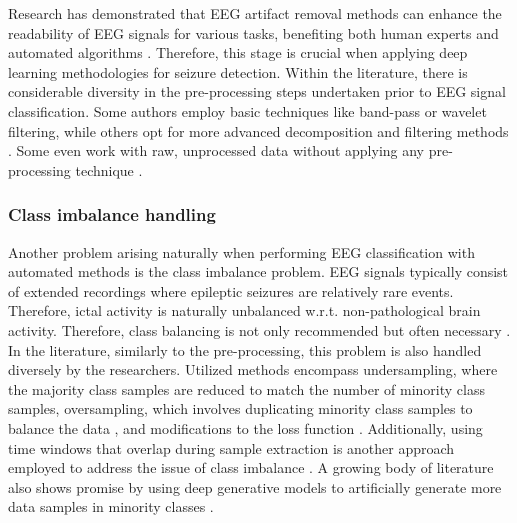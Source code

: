 \documentclass[a4paper,fleqn]{cas-sc}
\begin{document}
Research has demonstrated that EEG artifact removal methods can enhance the readability of EEG signals for various tasks, benefiting both human experts and automated algorithms \cite{JinArtifactSota, KunjiraPreprocessingEEG}. Therefore, this stage is crucial when applying deep learning methodologies for seizure detection. Within the literature, there is considerable diversity in the pre-processing steps undertaken prior to EEG signal classification. Some authors employ basic techniques like band-pass \cite{JiaEfficientGraphConv} or wavelet \cite{GaoWaveletCnnClassification} filtering, while others opt for more advanced decomposition and filtering methods \cite{GiudiceCNNAdvancedPrepro}. Some even work with raw, unprocessed data without applying any pre-processing technique \cite{LiChenFFTCNN, Wang1DCNNPrediction, YaoBiLSTM}.

\subsubsection{Class imbalance handling}
Another problem arising naturally when performing EEG classification with automated methods is the class imbalance problem. EEG signals typically consist of extended recordings where epileptic seizures are relatively rare events. Therefore, ictal activity is naturally unbalanced w.r.t. non-pathological brain activity. Therefore, class balancing is not only recommended but often necessary \cite{abd2013imbalance}.
In the literature, similarly to the pre-processing, this problem is also handled diversely by the researchers. Utilized methods encompass undersampling, where the majority class samples are reduced to match the number of minority class samples, oversampling, which involves duplicating minority class samples to balance the data \cite{JiaEfficientGraphConv}, and modifications to the loss function \cite{ZhaoGraphFocalLoss}. Additionally, using time windows that overlap during sample extraction is another approach employed to address the issue of class imbalance \cite{ZhaoGraphFocalLoss,he2022gatblstm}. A growing body of literature also shows promise by using deep generative models to artificially generate more data samples in minority classes \cite{chao2021GanAug}.




\end{document}

